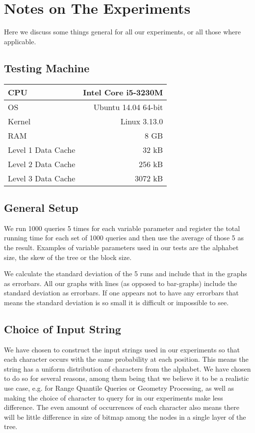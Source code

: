 \section{Notes on The Experiments}
Here we discuss some things general for all our experiments, or all those where applicable.

\subsection{Testing Machine}
\begin{tabular}{|lr|}
\hline
CPU				&	Intel Core i5-3230M \\ \hline
OS				&	Ubuntu 14.04 64-bit \\ \hline
Kernel			&	Linux 3.13.0 \\ \hline
RAM				&	8 GB 	\\ \hline
Level 1 Data Cache	&	32 kB \\ \hline
Level 2 Data Cache	&	256 kB \\ \hline
Level 3 Data Cache	&	3072 kB \\ \hline
\end{tabular}

\subsection{General Setup}
\label{sec:ExpNotesGeneralSetup}
We run 1000 queries 5 times for each variable parameter and register the total running time for each set of 1000 queries and then use the average of those 5 as the result.
Examples of variable parameters used in our tests are the alphabet size, the skew of the tree or the block size.

We calculate the standard deviation of the 5 runs and include that in the graphs as errorbars.
All our graphs with lines (as opposed to bar-graphs) include the standard deviation as errorbars.
If one appears not to have any errorbars that means the standard deviation is so small it is difficult or impossible to see.

\subsection{Choice of Input String}
\label{sec:choiceOfInputString}
We have chosen to construct the input strings used in our experiments so that each character occurs with the same probability at each position.
This means the string has a uniform distribution of characters from the alphabet.
We have chosen to do so for several reasons, among them being that we believe it to be a realistic use case, e.g. for Range Quantile Queries or Geometry Processing, as well as making the choice of character to query for in our experiments make less difference.
The even amount of occurrences of each character also means there will be little difference in size of bitmap among the nodes in a single layer of the tree.

